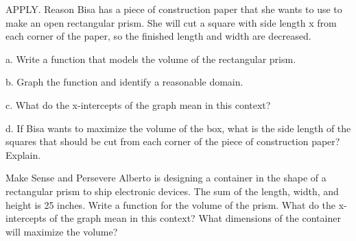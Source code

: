 \documentclass{article}
\newenvironment{practice}[2]{}{}        %
\newcommand{\answer}[1]{}               %
\newcommand{\placeholder}[2]{}          %
\begin{document}
\begin{practice}{28}{3}
APPLY. Reason Bisa has a piece of construction paper that she wants to use to make an open rectangular prism. She will cut a square with side length x from each corner of the paper, so the finished length and width are decreased.
\placeholder{diagram}{Purple and orange rectangular construction paper, width 11 in. shown above and height 8 in. at the right with dimension arrows. White dashed cut lines mark a square at each corner; each corner square has horizontal and vertical side lengths labeled x.}
a. Write a function that models the volume of the rectangular prism.
\answer{a. (f(x)=4x^3-38x^2+88x)}
b. Graph the function and identify a reasonable domain.
\answer{b. reasonable domain: (0<x<4)}
\placeholder{graph}{Answer 28b: red cubic (f(x)=4x^3-38x^2+88x), arrows at lower left and upper right. Axes x and y with arrows, O at origin. Grid x spacing 1, labeled -2,2,4,6; y spacing 10, labeled -20,20,40,60. Window approximately x[-3,7], y[-70,70]. Intercepts x=0,4,5.5; relative maximum near (1.5,60), relative minimum near (4.8,-10).}
c. What do the x-intercepts of the graph mean in this context?
\answer{c. x-intercepts: 0, 4, and 5.5; 0 and 4 represent the side lengths of the cut squares that will result in a box with 0 volume. The intercept at 5.5 is not meaningful, because it is not possible to cut two 5.5-inch corners from an 8-inch side.}
d. If Bisa wants to maximize the volume of the box, what is the side length of the squares that should be cut from each corner of the piece of construction paper? Explain.
\answer{d. About 1.5 in. will create a box with a volume of about 60 (in.^3).}
\end{practice}
\begin{practice}{29}{3}
Make Sense and Persevere Alberto is designing a container in the shape of a rectangular prism to ship electronic devices. The sum of the length, width, and height is 25 inches. Write a function for the volume of the prism. What do the x-intercepts of the graph mean in this context? What dimensions of the container will maximize the volume?
\placeholder{diagram}{Light blue rectangular prism in perspective, all edges dashed. Red dimension arrows label vertical height x at left and front horizontal length x+10 below. Depth edges recede upward and to the right; no depth label printed.}
\answer{(V=f(x)=-2x^3-5x^2+150x). The x-intercepts 0 and 7.5 are values of x for which the volume is 0. There is also an x-intercept at -10, but it has no contextual meaning. The function has a maximum when x is approximately 4. So the container has a maximum volume when height (\approx4) in., length (\approx14) in., and width (\approx7) in.}
\end{practice}
\end{document}
